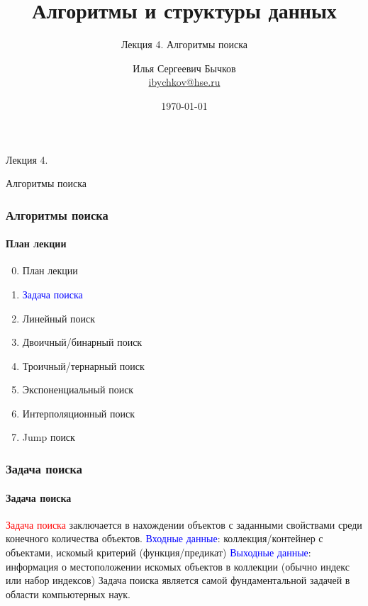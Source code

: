 \documentclass[aspectratio=169]{beamer}
\title[Title]{Алгоритмы и структуры данных}
\subtitle{Лекция 4. Алгоритмы поиска}
\author[Author's name]{Илья Сергеевич Бычков\\ \smallskip \scriptsize \url{ibychkov@hse.ru}}
\institute{НИУ ВШЭ - Нижний Новгород}
\date{\today}
\begin{document}
\frame[plain]{\titlepage}

\begin{frame}[c]

\begin{center}
\Huge Лекция 4.

\Huge Алгоритмы поиска
\end{center}

\end{frame}

\begin{frame}
\frametitle{Алгоритмы поиска}
\framesubtitle{План лекции}

\begin{enumerate}
  \setcounter{enumi}{-1}
  \item{План лекции}
  \item{\textcolor{blue}{Задача поиска}}
  \item{Линейный поиск}
  \item{Двоичный/бинарный поиск}
  \item{Троичный/тернарный поиск}
  \item{Экспоненциальный поиск}
  \item{Интерполяционный поиск}
  \item{Jump поиск}
\end{enumerate}
\end{frame}



\begin{frame}
\frametitle{Задача поиска}
\framesubtitle{Задача поиска}
\justifying
\textcolor{red}{Задача поиска} заключается в нахождении объектов с заданными свойствами среди конечного количества объектов.
\newline\newline
\textcolor{blue}{Входные данные}: коллекция/контейнер с объектами, искомый критерий \newline (функция/предикат)\newline\newline
\textcolor{blue}{Выходные данные}: информация о местоположении искомых объектов в коллекции (обычно индекс или набор индексов)\newline\newline
Задача поиска является самой фундаментальной задачей в области компьютерных наук.
\end{frame}
\end{document}
